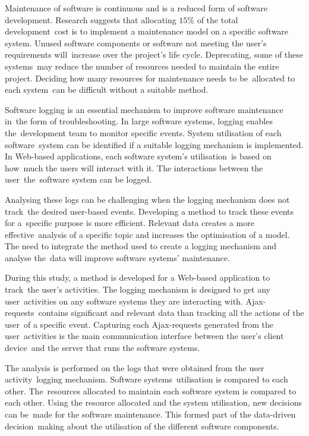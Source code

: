 Maintenance of software is continuous and is a reduced form of software development. Research suggests that allocating $15\%$ of the total development cost is to implement a maintenance model on a specific software system. Unused software components or software not meeting the user's requirements will increase over the project's life cycle. Deprecating, some of these systems may reduce the number of resources needed to maintain the entire project. Deciding how many resources for maintenance needs to be allocated to each system can be difficult without a suitable method.\par Software logging is an essential mechanism to improve software maintenance in the form of troubleshooting. In large software systems, logging enables the development team to monitor specific events. System utilisation of each software system can be identified if a suitable logging mechanism is implemented. In Web-based applications, each software system's utilisation is based on how much the users will interact with it. The interactions between the user the software system can be logged. \par Analysing these logs can be challenging when the logging mechanism does not track the desired user-based events. Developing a method to track these events for a specific purpose is more efficient. Relevant data creates a more effective analysis of a specific topic and increases the optimisation of a model. The need to integrate the method used to create a logging mechanism and analyse the data will improve software systems' maintenance.\par During this study, a method is developed for a Web-based application to track the user's activities. The logging mechanism is designed to get any user activities on any software systems they are interacting with. Ajax-requests contains significant and relevant data than tracking all the actions of the user of a specific event. Capturing each Ajax-requests generated from the user activities is the main communication interface between the user's client device and the server that runs the software systems.\par The analysis is performed on the logs that were obtained from the user activity logging mechanism. Software systems utilisation is compared to each other. The resources allocated to maintain each software system is compared to each other. Using the resource allocated and the system utilisation, new decisions can be made for the software maintenance. This formed part of the data-driven decision making about the utilisation of the different software components.